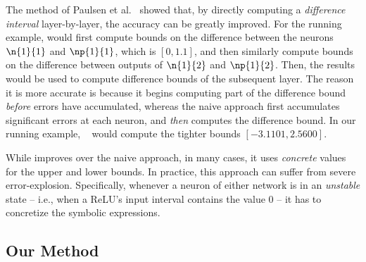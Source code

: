 The \ReluDiff{} method of Paulsen et al.~\cite{PaulsenWW20} showed
that, by directly computing a \textit{difference interval}
layer-by-layer, the accuracy can be greatly improved.  For the running
example, \ReluDiff{} would first compute bounds on the difference
between the neurons $ \n{1}{1} $ and $ \np{1}{1} $, which is $ [0,
1.1] $, and then similarly compute bounds on the difference between
outputs of $ \n{1}{2} $ and $ \np{1}{2} $. Then, the results would be
used to compute difference bounds of the subsequent layer.
%
The reason it is more accurate is because it begins computing part of
the difference bound \emph{before} errors have accumulated, whereas
the naive approach first accumulates significant errors at each
neuron, and \emph{then} computes the difference bound.
%
In our running example, \ReluDiff{}~\cite{PaulsenWW20} would
compute the tighter bounds $ [-3.1101, 2.5600] $.


While \ReluDiff{} improves over the naive approach, in many cases,
it uses \emph{concrete} values for the upper and lower bounds.
In practice, this approach can suffer from severe error-explosion.
Specifically,
whenever a neuron of either network is in an \textit{unstable} state --
i.e., when a ReLU's input interval contains the value 0 -- it has to
concretize the symbolic expressions.



\subsection{Our Method}


